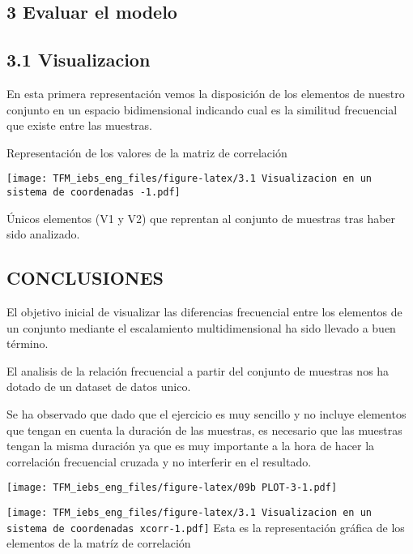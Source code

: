 \documentclass[
]{article}
\begin{document}
\newpage

\hypertarget{evaluar-el-modelo}{%
\subsection{3 Evaluar el modelo}\label{evaluar-el-modelo}}

\hypertarget{visualizacion}{%
\subsection{3.1 Visualizacion}\label{visualizacion}}

En esta primera representación vemos la disposición de los elementos de
nuestro conjunto en un espacio bidimensional indicando cual es la
similitud frecuencial que existe entre las muestras.

Representación de los valores de la matriz de correlación

\texttt{[image: TFM\_iebs\_eng\_files/figure-latex/3.1 Visualizacion en un sistema de coordenadas -1.pdf]}

Únicos elementos (V1 y V2) que reprentan al conjunto de muestras tras
haber sido analizado.

\newpage

\hypertarget{conclusiones}{%
\subsection{CONCLUSIONES}\label{conclusiones}}

El objetivo inicial de visualizar las diferencias frecuencial entre los
elementos de un conjunto mediante el escalamiento multidimensional ha
sido llevado a buen término.

El analisis de la relación frecuencial a partir del conjunto de muestras
nos ha dotado de un dataset de datos unico.

Se ha observado que dado que el ejercicio es muy sencillo y no incluye
elementos que tengan en cuenta la duración de las muestras, es necesario
que las muestras tengan la misma duración ya que es muy importante a la
hora de hacer la correlación frecuencial cruzada y no interferir en el
resultado.

\vspace{45pt}

\texttt{[image: TFM\_iebs\_eng\_files/figure-latex/09b PLOT-3-1.pdf]}

\texttt{[image: TFM\_iebs\_eng\_files/figure-latex/3.1 Visualizacion en un sistema de coordenadas xcorr-1.pdf]}
Esta es la representación gráfica de los elementos de la matríz de
correlación
\end{document}

